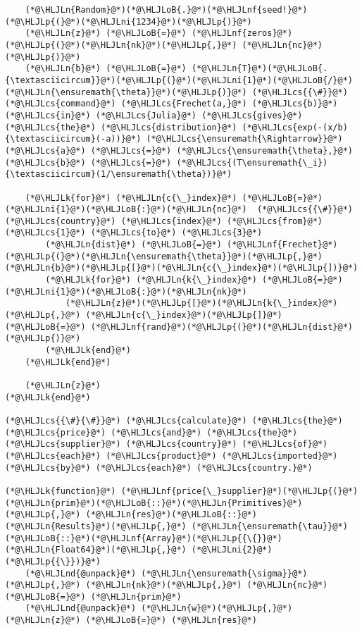\documentclass[12pt,a4paper]{article}
\newcommand{\HLJLk}[1]{\textcolor[RGB]{148,91,176}{\textbf{#1}}}
\newcommand{\HLJLn}[1]{#1}
\newcommand{\HLJLnd}[1]{\textcolor[RGB]{214,102,97}{#1}}
\newcommand{\HLJLnf}[1]{\textcolor[RGB]{66,102,213}{#1}}
\newcommand{\HLJLni}[1]{\textcolor[RGB]{59,151,46}{#1}}
\newcommand{\HLJLoB}[1]{\textcolor[RGB]{102,102,102}{\textbf{#1}}}
\newcommand{\HLJLp}[1]{#1}
\newcommand{\HLJLcs}[1]{\textcolor[RGB]{153,153,119}{\textit{#1}}}
\begin{document}
\begin{lstlisting}
    (*@\HLJLn{Random}@*)(*@\HLJLoB{.}@*)(*@\HLJLnf{seed!}@*)(*@\HLJLp{(}@*)(*@\HLJLni{1234}@*)(*@\HLJLp{)}@*)
    (*@\HLJLn{z}@*) (*@\HLJLoB{=}@*) (*@\HLJLnf{zeros}@*)(*@\HLJLp{(}@*)(*@\HLJLn{nk}@*)(*@\HLJLp{,}@*) (*@\HLJLn{nc}@*)(*@\HLJLp{)}@*)
    (*@\HLJLn{b}@*) (*@\HLJLoB{=}@*) (*@\HLJLn{T}@*)(*@\HLJLoB{.{\textasciicircum}}@*)(*@\HLJLp{(}@*)(*@\HLJLni{1}@*)(*@\HLJLoB{/}@*)(*@\HLJLn{\ensuremath{\theta}}@*)(*@\HLJLp{)}@*) (*@\HLJLcs{{\#}}@*) (*@\HLJLcs{command}@*) (*@\HLJLcs{Frechet(a,}@*) (*@\HLJLcs{b)}@*) (*@\HLJLcs{in}@*) (*@\HLJLcs{Julia}@*) (*@\HLJLcs{gives}@*) (*@\HLJLcs{the}@*) (*@\HLJLcs{distribution}@*) (*@\HLJLcs{exp(-(x/b){\textasciicircum}(-a))}@*) (*@\HLJLcs{\ensuremath{\Rightarrow}}@*) (*@\HLJLcs{a}@*) (*@\HLJLcs{=}@*) (*@\HLJLcs{\ensuremath{\theta},}@*) (*@\HLJLcs{b}@*) (*@\HLJLcs{=}@*) (*@\HLJLcs{(T\ensuremath{\_i}){\textasciicircum}(1/\ensuremath{\theta})}@*)

    (*@\HLJLk{for}@*) (*@\HLJLn{c{\_}index}@*) (*@\HLJLoB{=}@*) (*@\HLJLni{1}@*)(*@\HLJLoB{:}@*)(*@\HLJLn{nc}@*)  (*@\HLJLcs{{\#}}@*) (*@\HLJLcs{country}@*) (*@\HLJLcs{index}@*) (*@\HLJLcs{from}@*) (*@\HLJLcs{1}@*) (*@\HLJLcs{to}@*) (*@\HLJLcs{3}@*)
        (*@\HLJLn{dist}@*) (*@\HLJLoB{=}@*) (*@\HLJLnf{Frechet}@*)(*@\HLJLp{(}@*)(*@\HLJLn{\ensuremath{\theta}}@*)(*@\HLJLp{,}@*) (*@\HLJLn{b}@*)(*@\HLJLp{[}@*)(*@\HLJLn{c{\_}index}@*)(*@\HLJLp{])}@*)
        (*@\HLJLk{for}@*) (*@\HLJLn{k{\_}index}@*) (*@\HLJLoB{=}@*) (*@\HLJLni{1}@*)(*@\HLJLoB{:}@*)(*@\HLJLn{nk}@*)
            (*@\HLJLn{z}@*)(*@\HLJLp{[}@*)(*@\HLJLn{k{\_}index}@*)(*@\HLJLp{,}@*) (*@\HLJLn{c{\_}index}@*)(*@\HLJLp{]}@*) (*@\HLJLoB{=}@*) (*@\HLJLnf{rand}@*)(*@\HLJLp{(}@*)(*@\HLJLn{dist}@*)(*@\HLJLp{)}@*)
        (*@\HLJLk{end}@*)
    (*@\HLJLk{end}@*)

    (*@\HLJLn{z}@*)
(*@\HLJLk{end}@*)

(*@\HLJLcs{{\#}{\#}}@*) (*@\HLJLcs{calculate}@*) (*@\HLJLcs{the}@*) (*@\HLJLcs{price}@*) (*@\HLJLcs{and}@*) (*@\HLJLcs{the}@*) (*@\HLJLcs{supplier}@*) (*@\HLJLcs{country}@*) (*@\HLJLcs{of}@*) (*@\HLJLcs{each}@*) (*@\HLJLcs{product}@*) (*@\HLJLcs{imported}@*) (*@\HLJLcs{by}@*) (*@\HLJLcs{each}@*) (*@\HLJLcs{country.}@*)

(*@\HLJLk{function}@*) (*@\HLJLnf{price{\_}supplier}@*)(*@\HLJLp{(}@*)(*@\HLJLn{prim}@*)(*@\HLJLoB{::}@*)(*@\HLJLn{Primitives}@*)(*@\HLJLp{,}@*) (*@\HLJLn{res}@*)(*@\HLJLoB{::}@*)(*@\HLJLn{Results}@*)(*@\HLJLp{,}@*) (*@\HLJLn{\ensuremath{\tau}}@*)(*@\HLJLoB{::}@*)(*@\HLJLnf{Array}@*)(*@\HLJLp{{\{}}@*)(*@\HLJLn{Float64}@*)(*@\HLJLp{,}@*) (*@\HLJLni{2}@*)(*@\HLJLp{{\}})}@*)
    (*@\HLJLnd{@unpack}@*) (*@\HLJLn{\ensuremath{\sigma}}@*)(*@\HLJLp{,}@*) (*@\HLJLn{nk}@*)(*@\HLJLp{,}@*) (*@\HLJLn{nc}@*) (*@\HLJLoB{=}@*) (*@\HLJLn{prim}@*)
    (*@\HLJLnd{@unpack}@*) (*@\HLJLn{w}@*)(*@\HLJLp{,}@*) (*@\HLJLn{z}@*) (*@\HLJLoB{=}@*) (*@\HLJLn{res}@*)


\end{lstlisting}
\end{document}
